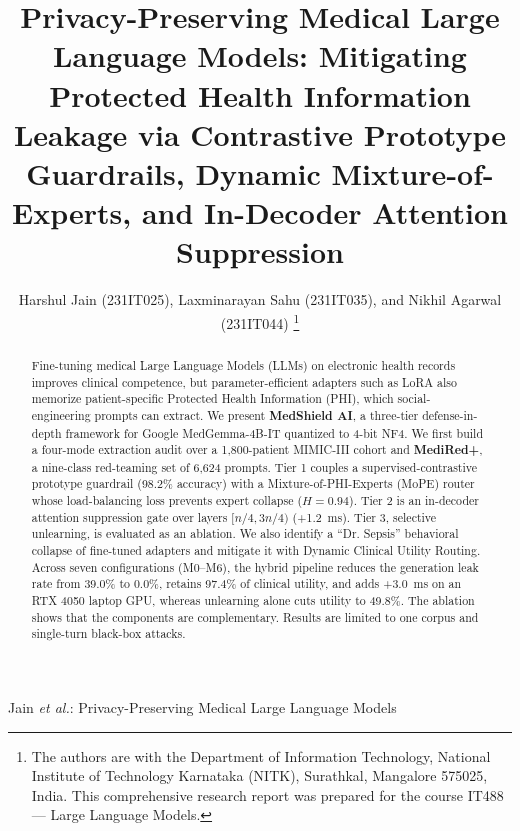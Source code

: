 \documentclass[lettersize,journal]{IEEEtran}
\begin{document}
\title{Privacy-Preserving Medical Large Language Models: Mitigating Protected Health Information Leakage via Contrastive Prototype Guardrails, Dynamic Mixture-of-Experts, and In-Decoder Attention Suppression}

\author{Harshul Jain (231IT025), Laxminarayan Sahu (231IT035), and Nikhil Agarwal (231IT044)
\thanks{The authors are with the Department of Information Technology, National Institute of Technology Karnataka (NITK), Surathkal, Mangalore 575025, India. This comprehensive research report was prepared for the course IT488 --- Large Language Models.}
}

%
{Jain \MakeLowercase{\textit{et al.}}: Privacy-Preserving Medical Large Language Models}

\maketitle

\begin{abstract}
Fine-tuning medical Large Language Models (LLMs) on electronic health records improves clinical competence, but parameter-efficient adapters such as LoRA also memorize patient-specific Protected Health Information (PHI), which social-engineering prompts can extract. We present \textbf{MedShield AI}, a three-tier defense-in-depth framework for Google MedGemma-4B-IT quantized to 4-bit NF4. We first build a four-mode extraction audit over a 1,800-patient MIMIC-III cohort and \textbf{MediRed+}, a nine-class red-teaming set of 6,624 prompts. Tier 1 couples a supervised-contrastive prototype guardrail (98.2\% accuracy) with a Mixture-of-PHI-Experts (MoPE) router whose load-balancing loss prevents expert collapse ($H=0.94$). Tier 2 is an in-decoder attention suppression gate over layers $[n/4, 3n/4)$ (+1.2~ms). Tier 3, selective unlearning, is evaluated as an ablation. We also identify a ``Dr. Sepsis'' behavioral collapse of fine-tuned adapters and mitigate it with Dynamic Clinical Utility Routing. Across seven configurations (M0--M6), the hybrid pipeline reduces the generation leak rate from 39.0\% to 0.0\%, retains 97.4\% of clinical utility, and adds +3.0~ms on an RTX 4050 laptop GPU, whereas unlearning alone cuts utility to 49.8\%. The ablation shows that the components are complementary. Results are limited to one corpus and single-turn black-box attacks.
\end{abstract}
\end{document}
